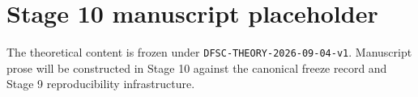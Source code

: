 \section*{Stage 10 manuscript placeholder}
The theoretical content is frozen under \texttt{DFSC-THEORY-2026-09-04-v1}. Manuscript prose will be constructed in Stage 10 against the canonical freeze record and Stage 9 reproducibility infrastructure.
